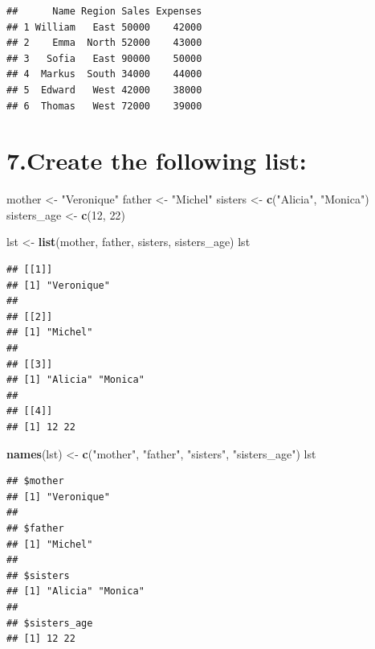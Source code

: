\documentclass[]{article}
\newenvironment{Shaded}{\begin{snugshade}}{\end{snugshade}}
\newcommand{\DecValTok}[1]{\textcolor[rgb]{0.00,0.00,0.81}{#1}}
\newcommand{\KeywordTok}[1]{\textcolor[rgb]{0.13,0.29,0.53}{\textbf{#1}}}
\newcommand{\NormalTok}[1]{#1}
\newcommand{\StringTok}[1]{\textcolor[rgb]{0.31,0.60,0.02}{#1}}
\begin{document}
\begin{verbatim}
##      Name Region Sales Expenses
## 1 William   East 50000    42000
## 2    Emma  North 52000    43000
## 3   Sofia   East 90000    50000
## 4  Markus  South 34000    44000
## 5  Edward   West 42000    38000
## 6  Thomas   West 72000    39000
\end{verbatim}

\hypertarget{create-the-following-list}{%
\section{7.Create the following list:}\label{create-the-following-list}}

\begin{Shaded}
\begin{Highlighting}[]
\NormalTok{mother <-}\StringTok{ "Veronique"}
\NormalTok{father <-}\StringTok{ "Michel"}
\NormalTok{sisters <-}\StringTok{ }\KeywordTok{c}\NormalTok{(}\StringTok{"Alicia"}\NormalTok{, }\StringTok{"Monica"}\NormalTok{)}
\NormalTok{sisters_age <-}\StringTok{ }\KeywordTok{c}\NormalTok{(}\DecValTok{12}\NormalTok{, }\DecValTok{22}\NormalTok{)}

\NormalTok{lst <-}\StringTok{ }\KeywordTok{list}\NormalTok{(mother, father, sisters, sisters_age)}
\NormalTok{lst}
\end{Highlighting}
\end{Shaded}

\begin{verbatim}
## [[1]]
## [1] "Veronique"
## 
## [[2]]
## [1] "Michel"
## 
## [[3]]
## [1] "Alicia" "Monica"
## 
## [[4]]
## [1] 12 22
\end{verbatim}

\begin{Shaded}
\begin{Highlighting}[]
\KeywordTok{names}\NormalTok{(lst) <-}\StringTok{ }\KeywordTok{c}\NormalTok{(}\StringTok{"mother"}\NormalTok{, }\StringTok{"father"}\NormalTok{, }\StringTok{"sisters"}\NormalTok{, }\StringTok{"sisters_age"}\NormalTok{)}
\NormalTok{lst}
\end{Highlighting}
\end{Shaded}

\begin{verbatim}
## $mother
## [1] "Veronique"
## 
## $father
## [1] "Michel"
## 
## $sisters
## [1] "Alicia" "Monica"
## 
## $sisters_age
## [1] 12 22
\end{verbatim}
\end{document}
